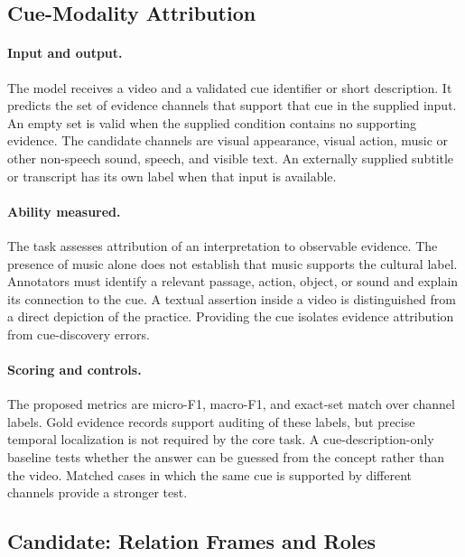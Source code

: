 \subsection{Cue-Modality Attribution}
\label{sec:modality-task}
\paragraph{Input and output.}
The model receives a video and a validated cue identifier or short description.
It predicts the set of evidence channels that support that cue in the supplied input.
An empty set is valid when the supplied condition contains no supporting evidence.
The candidate channels are visual appearance, visual action, music or other non-speech sound, speech, and visible text.
An externally supplied subtitle or transcript has its own label when that input is available.

\paragraph{Ability measured.}
The task assesses attribution of an interpretation to observable evidence.
The presence of music alone does not establish that music supports the cultural label.
Annotators must identify a relevant passage, action, object, or sound and explain its connection to the cue.
A textual assertion inside a video is distinguished from a direct depiction of the practice.
Providing the cue isolates evidence attribution from cue-discovery errors.

\paragraph{Scoring and controls.}
The proposed metrics are micro-F1, macro-F1, and exact-set match over channel labels.
Gold evidence records support auditing of these labels, but precise temporal localization is not required by the core task.
A cue-description-only baseline tests whether the answer can be guessed from the concept rather than the video.
Matched cases in which the same cue is supported by different channels provide a stronger test.

\subsection{Candidate: Relation Frames and Roles}
\label{sec:relation-task}
